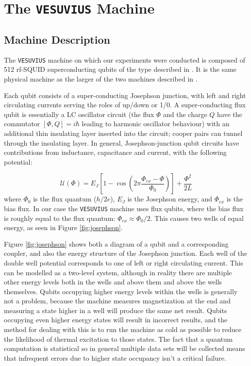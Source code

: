 \chapter{The \texttt{VESUVIUS} Machine}
\label{chap:machine}
\section{Machine Description}
The \texttt{VESUVIUS} machine on which our experiments were conducted is composed of 512 rf-SQUID superconducting qubits of the type described in \cite{qubit} \cite{dwave_nature}. It is the same physical machine as the larger of the two machines described in \cite{pudenz}.

Each qubit consists of a super-conducting Josephson junction, with left and right circulating currents serving the roles of up/down or 1/0.  A super-conducting flux qubit is essentially a LC oscillator circuit (the flux $\Phi$ and the charge $Q$ have the commutator $[\Phi,Q]=i\hbar$ leading to harmonic oscillator behaviour) with an additional thin insulating layer inserted into the circuit; cooper pairs can tunnel through the insulating layer.  In general, Josephson-junction qubit circuits have contributions from inductance, capacitance and current, with the following potential:\cite{qc}

\begin{equation}
	\mathcal{U}(\Phi) = E_J\left[1 - \cos\left(2\pi \frac{\Phi_{ex}-\Phi}{\Phi_0}\right)\right] + \frac{\Phi^2}{2L}
\end{equation}
where $\Phi_0$ is the flux quantum ($h/2e$), $E_J$ is the Josephson energy, and $\Phi_{ex}$ is the bias flux.  In our case the \texttt{VESUVIUS} machine uses flux qubits, where the bias flux is roughly equal to the flux quantum: $\Phi_{ex} \approx \Phi_0/2$.  This causes two wells of equal energy, as seen in Figure \ref{fig:josephson}.

Figure \ref{fig:josephson} shows both a diagram of a qubit and a corresponding coupler, and also the energy structure of the Josephson junction.  Each well of the double well potential corresponds to one of left or right circulating current.  This can be modelled as a two-level system, although in reality there are multiple other energy levels both in the wells and above them and above the wells themselves.  Qubits occupying higher energy levels within the wells is generally not a problem, because the machine measures magnetization at the end and measuring a state higher in a well will produce the same net result.\cite{qubit}
Qubits occupying even higher energy states will result in incorrect results, and the method for dealing with this is to run the machine as cold as possible to reduce the likelihood of thermal excitation to those states. The fact that a quantum computation is statistical so in general multiple data sets will be collected means that infrequent errors due to higher state occupancy isn't a critical failure.

